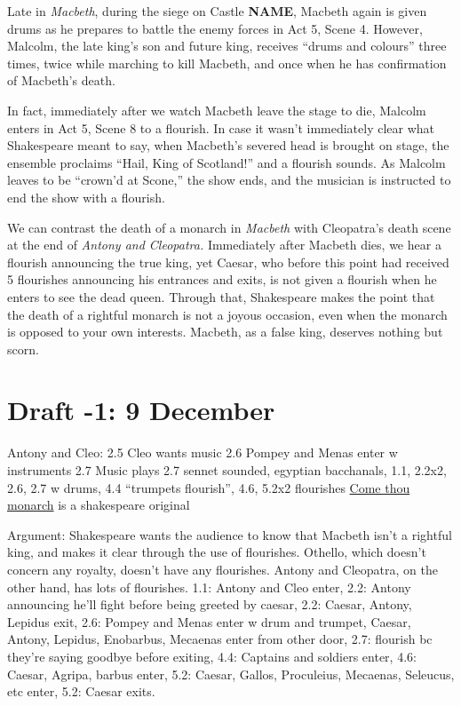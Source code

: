\documentclass[12pt]{article}[titlepage]
\newcommand{\say}[1]{``#1''}
\newcommand{\1}{\={a}}
\newcommand{\2}{\={e}}
\newcommand{\3}{\={\i}}
\newcommand{\4}{\=o}
\newcommand{\5}{\=u}
\newcommand{\6}{\={A}}
\renewcommand{\,}{\textsuperscript{,}}
\begin{document}
Late in \textit{Macbeth}, during the siege on Castle \textbf{NAME}, Macbeth again is given drums as he prepares to battle the enemy forces in Act 5, Scene 4.
However, Malcolm, the late king's son and future king, receives \say{drums and colours} three times, twice while marching to kill Macbeth, and once when he has confirmation of Macbeth's death.

In fact, immediately after we watch Macbeth leave the stage to die, Malcolm enters in Act 5, Scene 8 to a flourish.
In case it wasn't immediately clear what Shakespeare meant to say, when Macbeth's severed head is brought on stage, the ensemble proclaims \say{Hail, King of Scotland!} and a flourish sounds.
As Malcolm leaves to be \say{crown'd at Scone,} the show ends, and the musician is instructed to end the show with a flourish.

We can contrast the death of a monarch in \textit{Macbeth} with Cleopatra's death scene at the end of \textit{Antony and Cleopatra.}
Immediately after Macbeth dies, we hear a flourish announcing the true king, yet Caesar, who before this point had received 5 flourishes announcing his entrances and exits, is not given a flourish when he enters to see the dead queen.
Through that, Shakespeare makes the point that the death of a rightful monarch is not a joyous occasion, even when the monarch is opposed to your own interests.
Macbeth, as a false king, deserves nothing but scorn.
\section{Draft -1: 9 December}
Antony and Cleo:
2.5 Cleo wants music
2.6 Pompey and Menas enter w instruments
2.7 Music plays
2.7 sennet sounded, egyptian bacchanals, 
1.1, 2.2x2, 2.6, 2.7 w drums, 4.4 \say{trumpets flourish}, 4.6, 5.2x2 flourishes
\href{http://www.lieder.net/lieder/get_text.html?TextId=18775}{Come thou monarch}  is a shakespeare original 

Argument: Shakespeare wants the audience to know that Macbeth isn't a rightful king, and makes it clear through the use of flourishes.
Othello, which doesn't concern any royalty, doesn't have any flourishes.
Antony and Cleopatra, on the other hand, has lots of flourishes.
1.1: Antony and Cleo enter,
2.2: Antony announcing he'll fight before being greeted by caesar,
2.2: Caesar, Antony, Lepidus exit,
2.6: Pompey and Menas enter w drum and trumpet, Caesar, Antony, Lepidus, Enobarbus, Mecaenas enter from other door,
2.7: flourish bc they're saying goodbye before exiting,
4.4: Captains and soldiers enter,
4.6: Caesar, Agripa, barbus enter,
5.2: Caesar, Gallos, Proculeius, Mecaenas, Seleucus, etc enter,
5.2: Caesar exits.
\end{document}
